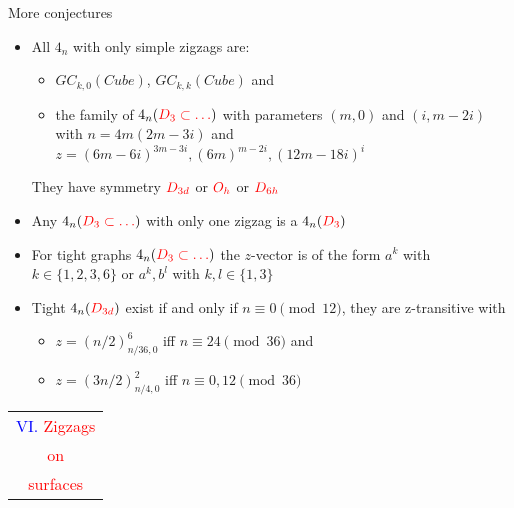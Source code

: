 \documentclass[%
pdf,
colorBG,
slideColor,
]{prosper}
\begin{document}
\begin{slide}{More conjectures}
\vspace{-4mm}


\begin{itemize}
\item All $4_n$ with only simple zigzags are:
\begin{itemize}
\item $GC_{k,0}(Cube)$, $GC_{k,k}(Cube)$ and
\item the family of $4_n(\textcolor{red}{D_3\subset\dots})$ with parameters $(m,0)$ and $(i, m-2i)$ with $n=4m(2m-3i)$ and
$z=(6m-6i)^{3m-3i}, (6m)^{m-2i}, (12m-18i)^i$
\end{itemize}
They have symmetry $\textcolor{red}{D_{3d}}$ or $\textcolor{red}{O_{h}}$ or $\textcolor{red}{D_{6h}}$
\item Any $4_n(\textcolor{red}{D_{3}\subset\dots})$ with only one zigzag is a $4_n(\textcolor{red}{D_3})$
\item For tight graphs $4_n(\textcolor{red}{D_3\subset \dots})$ the $z$-vector is of the form $a^k$ with $k\in \{1, 2, 3, 6\}$ or $a^k, b^l$ with $k,l\in \{1, 3\}$
\item Tight $4_n(\textcolor{red}{D_{3d}})$ exist if and only if $n\equiv 0\pmod {12}$, they are z-transitive with
\begin{itemize}
\item $z=(n/2)^6_{n/36,0}$ iff $n\equiv 24\pmod {36}$ and
\item $z=(3n/2)^2_{n/4,0}$ iff $n\equiv 0,12\pmod {36}$
\end{itemize}

\end{itemize}

\end{slide}













\begin{slide}{}
\begin{center}
{\Huge 
\begin{tabular*}{6cm}{c}
\\[-0.5cm]
\textcolor{blue}{VI. }\textcolor{red}{Zigzags}\\
\textcolor{red}{on}\\
\textcolor{red}{surfaces}
\end{tabular*}
}
\end{center}
\end{slide}
\end{document}
